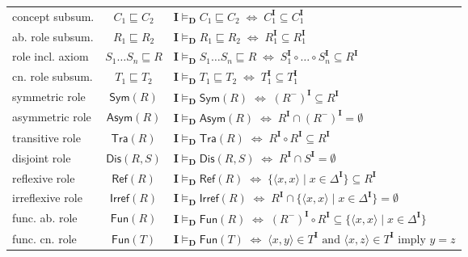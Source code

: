 \documentclass[a4paper]{llncs}
\newcommand{\I}{\mathbf{I}}
\newcommand{\D}{\mathbf{D}}
\newcommand{\sym}{\mathsf{Sym}}
\newcommand{\asym}{\mathsf{Asym}}
\newcommand{\refl}{\mathsf{Ref}}
\newcommand{\irref}{\mathsf{Irref}}
\newcommand{\tra}{\mathsf{Tra}}
\newcommand{\fun}{\mathsf{Fun}}
\begin{document}
{\begin{longtable}{|>{\centering}m{2.5cm}|c|>{\centering\arraybackslash}m{7.5cm}|}
\hline

concept subsum. & $C_1 \sqsubseteq C_2$ & $\I \models_\D C_1 \sqsubseteq C_2 \; \Longleftrightarrow \; C_1^\I \subseteq C_1^\I$ \\

ab. role subsum. & $ R_1 \sqsubseteq R_2$ & $\I \models_\D R_1 \sqsubseteq R_2 \; \Longleftrightarrow \; R_1^\I \subseteq R_1^\I$\\

role incl. axiom & $S_1 \ldots S_n \sqsubseteq R$ & $\I \models_\D S_1 \ldots S_n \sqsubseteq R  \; \Longleftrightarrow \; S_1^\I\circ \ldots \circ S_n^\I \subseteq R^\I$\\
cn. role subsum. & $ T_1 \sqsubseteq T_2$ & $\I \models_\D T_1 \sqsubseteq T_2 \; \Longleftrightarrow \; T_1^\I \subseteq T_1^\I$\\

\hline

symmetric role & $\sym(R)$ & $\I \models_\D \sym(R) \; \Longleftrightarrow \; (R^-)^\I \subseteq R^\I$\\

asymmetric role & $\asym(R)$ & $\I \models_\D \asym(R) \; \Longleftrightarrow \; R^\I \cap (R^-)^\I = \emptyset $\\

transitive role & $\tra(R)$ & $\I \models_\D \tra(R) \; \Longleftrightarrow \; R^\I \circ R^\I \subseteq R^\I$\\

disjoint role & $\mathsf{Dis}(R,S)$ & $\I \models_\D \mathsf{Dis}(R,S) \; \Longleftrightarrow \; R^\I \cap S^\I = \emptyset$\\

reflexive role & $\refl(R)$& $\I \models_\D \refl(R) \; \Longleftrightarrow \; \{ \langle x,x \rangle \mid x \in \Delta^\I\} \subseteq R^\I$\\

irreflexive role & $\irref(R)$& $\I \models_\D \irref(R) \; \Longleftrightarrow \; R^\I \cap \{ \langle x,x \rangle \mid x \in \Delta^\I\} = \emptyset  $\\

func. ab. role & $\fun(R)$ & $\I \models_\D \fun(R) \; \Longleftrightarrow \; (R^{-})^\I \circ R^\I \subseteq  \{ \langle x,x \rangle \mid x \in \Delta^\I\}$  \\

func. cn. role & $\fun(T)$ & $\I \models_\D \fun(T) \; \Longleftrightarrow \; \langle x,y \rangle \in T^\I \mbox{ and } \langle x,z \rangle \in T^\I \mbox{ imply } y = z$  \\


\end{longtable}}
\end{document}
